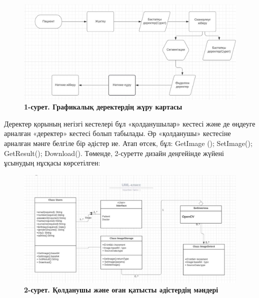 \begin{figure}[H]
	\centering
	\includegraphics[width=1\textwidth]{assets/191}
	\caption*{\bfseries 1-сурет. Графикалық деректердің жүру картасы}
\end{figure}


\begin{multicols}{2}

Деректер қорының негізгі кестелері бұл «қолданушылар» кестесі және де
өңдеуге арналған «деректер» кестесі болып табылады. Әр «қолданушы»
кестесіне арналған мәнге белгіле бір әдістер ие. Атап өтсек, бұл:
GetImage (); SetImage(); GetResult(); Download(). Төменде, 2-суретте
дизайн деңгейінде жүйені ұсынудың нұсқасы көрсетілген:
\end{multicols}

\begin{figure}[H]
	\centering
	\includegraphics[width=1\textwidth]{assets/192}
	\caption*{\bfseries 2-сурет. Қолданушы және оған қатысты әдістердің мәндері}
\end{figure}


